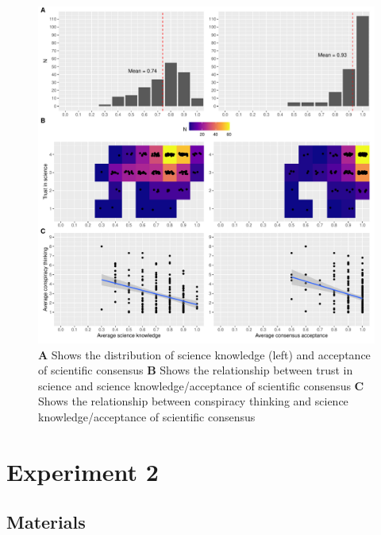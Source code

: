 \documentclass[
  doc,floatsintext]{apa6}
\begin{document}
\begin{figure}
\centering
\includegraphics{output/figures/exp1-plot-overview.pdf}
\caption{\label{fig:exp1-plot-overview}\textbf{A} Shows the distribution of science knowledge (left) and acceptance of scientific consensus \textbf{B} Shows the relationship between trust in science and science knowledge/acceptance of scientific consensus \textbf{C} Shows the relationship between conspiracy thinking and science knowledge/acceptance of scientific consensus}
\end{figure}

\clearpage

\section{Experiment 2}\label{exp2}

\subsection{Materials}\label{materials-4}

\FloatBarrier
\end{document}
